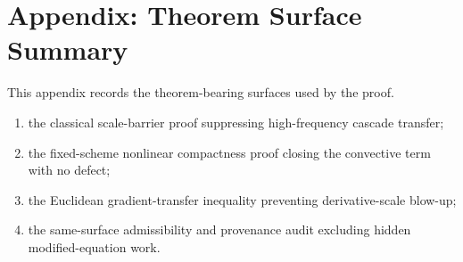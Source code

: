 \section{Appendix: Theorem Surface Summary}

This appendix records the theorem-bearing surfaces used by the proof.

\begin{enumerate}[leftmargin=*]
\item the classical scale-barrier proof suppressing high-frequency cascade transfer;
\item the fixed-scheme nonlinear compactness proof closing the convective term with no defect;
\item the Euclidean gradient-transfer inequality preventing derivative-scale blow-up;
\item the same-surface admissibility and provenance audit excluding hidden modified-equation work.
\end{enumerate}
